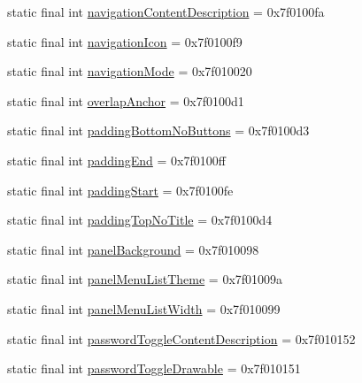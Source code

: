 \begin{CompactItemize}
\item 
static final int \hyperlink{classandroid_1_1support_1_1v7_1_1recyclerview_1_1_r_1_1attr_f9c4936c17c7bf81d4b083413d5dfe25}{navigationContentDescription} = 0x7f0100fa
\item 
static final int \hyperlink{classandroid_1_1support_1_1v7_1_1recyclerview_1_1_r_1_1attr_299d3d5f34c3cd2f1dcbc221748bf884}{navigationIcon} = 0x7f0100f9
\item 
static final int \hyperlink{classandroid_1_1support_1_1v7_1_1recyclerview_1_1_r_1_1attr_71fe4f9612123028a43b2b63beba72ce}{navigationMode} = 0x7f010020
\item 
static final int \hyperlink{classandroid_1_1support_1_1v7_1_1recyclerview_1_1_r_1_1attr_94c14ecd71a07909ea87dc7735d62f26}{overlapAnchor} = 0x7f0100d1
\item 
static final int \hyperlink{classandroid_1_1support_1_1v7_1_1recyclerview_1_1_r_1_1attr_316d278b88f90976c94cda117d65a77d}{paddingBottomNoButtons} = 0x7f0100d3
\item 
static final int \hyperlink{classandroid_1_1support_1_1v7_1_1recyclerview_1_1_r_1_1attr_8f5148053b1a9883f9fe4739ecc740ea}{paddingEnd} = 0x7f0100ff
\item 
static final int \hyperlink{classandroid_1_1support_1_1v7_1_1recyclerview_1_1_r_1_1attr_76739a635559718c2f66b00a6ca234ff}{paddingStart} = 0x7f0100fe
\item 
static final int \hyperlink{classandroid_1_1support_1_1v7_1_1recyclerview_1_1_r_1_1attr_53355c91757b7b9d0eb59fd402a3fec1}{paddingTopNoTitle} = 0x7f0100d4
\item 
static final int \hyperlink{classandroid_1_1support_1_1v7_1_1recyclerview_1_1_r_1_1attr_a54fd6ee37cdbdc76d4085882e200500}{panelBackground} = 0x7f010098
\item 
static final int \hyperlink{classandroid_1_1support_1_1v7_1_1recyclerview_1_1_r_1_1attr_e7fb584b23058c7f0d668e96b5dbc33a}{panelMenuListTheme} = 0x7f01009a
\item 
static final int \hyperlink{classandroid_1_1support_1_1v7_1_1recyclerview_1_1_r_1_1attr_7b429a63253c6f1759a886914b22cca7}{panelMenuListWidth} = 0x7f010099
\item 
static final int \hyperlink{classandroid_1_1support_1_1v7_1_1recyclerview_1_1_r_1_1attr_2603cd7174ed845ac9997c731ce28a66}{passwordToggleContentDescription} = 0x7f010152
\item 
static final int \hyperlink{classandroid_1_1support_1_1v7_1_1recyclerview_1_1_r_1_1attr_b7674a7bf749c697389052af83f14500}{passwordToggleDrawable} = 0x7f010151

\end{CompactItemize}
